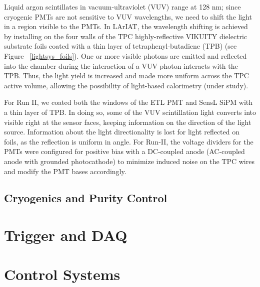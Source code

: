 Liquid argon scintillates in vacuum-ultraviolet (VUV) range at 128 nm; since cryogenic PMTs are not sensitive to VUV wavelengths, we need to shift the light in a region visible to the PMTs. In LArIAT, the wavelength shifting is achieved by installing on the four walls of the TPC highly-reflective VIKUITY dielectric substrate foils coated with a thin layer of tetraphenyl-butadiene (TPB) (see Figure ~\ref{lightsys_foils}). One or more visible photons  are emitted and reflected into the chamber during the interaction of a VUV photon interacts with the TPB. Thus, the light yield is increased and made more uniform across the TPC active volume, allowing the possibility of light-based calorimetry (under study).


For Run II, we coated both  the windows of the ETL PMT and SensL SiPM  with a thin layer of TPB. In doing so, some of the VUV scintillation light converts into visible right at the sensor faces, keeping information on the direction of the light source. Information about the light directionality is lost for light reflected on foils, as the reflection is uniform in angle. For Run-II, the voltage dividers for the PMTs were configured for positive bias with a DC-coupled anode (AC-coupled anode with grounded photocathode) to minimize induced noise on the TPC wires and modify the PMT bases accordingly.  


\subsection{Cryogenics and Purity Control}
\section{Trigger and DAQ}
\section{Control Systems}

